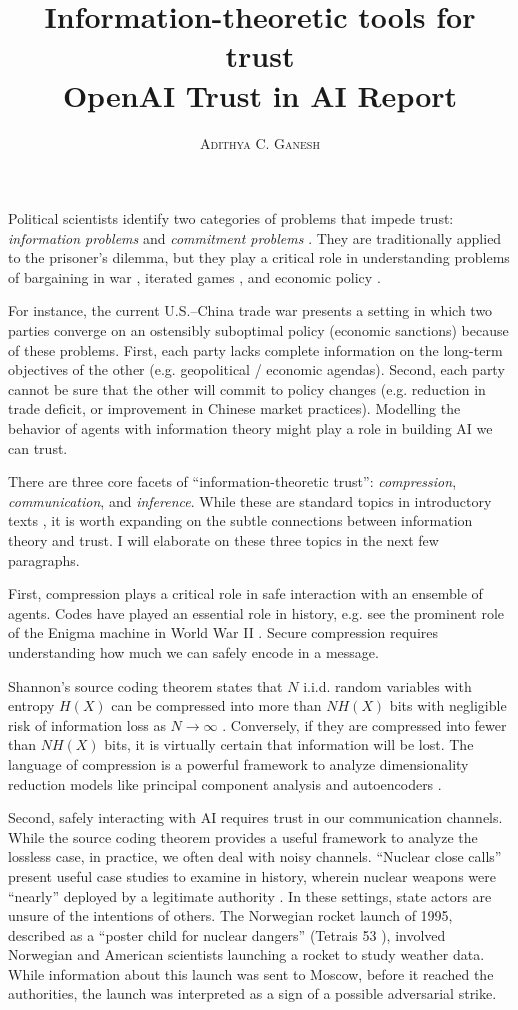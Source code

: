 \documentclass[11pt]{article}
\title{Information-theoretic tools for trust \\ \vspace{0.3cm} OpenAI Trust in AI Report}
\author{\textsc{Adithya C. Ganesh}}
\begin{document}
Political scientists identify two categories of problems that impede trust: {\it information problems} and {\it commitment problems} \cite{frieden2010world}.  They are traditionally applied to the prisoner's dilemma, but they play a critical role in understanding problems of bargaining in war \cite{lake2010two}, iterated games \cite{axelrod1981evolution}, and economic policy \cite{panagariya2003international}.

For instance, the current U.S.--China trade war presents a setting in which two parties converge on an ostensibly suboptimal policy (economic sanctions) because of these problems.  First, each party lacks complete information on the long-term objectives of the other (e.g. geopolitical / economic agendas).  Second, each party cannot be sure that the other will commit to policy changes (e.g. reduction in trade deficit, or improvement in Chinese market practices).  Modelling the behavior of agents with information theory might play a role in building AI we can trust. 

There are three core facets of ``information-theoretic trust'': {\it compression}, {\it communication}, and {\it inference}.  While these are standard topics in introductory texts \cite{cover2012elements}\cite{mackay2003information}, it is worth expanding on the subtle connections between information theory and trust.  I will elaborate on these three topics in the next few paragraphs.

First, compression plays a critical role in safe interaction with an ensemble of agents.  Codes have played an essential role in history, e.g. see the prominent role of the Enigma machine in World War II \cite{booss2003mathematics}.  Secure compression requires understanding how much we can safely encode in a message.

Shannon's source coding theorem states that $N$ i.i.d. random variables with entropy $H(X)$ can be compressed into more than $N H(X)$ bits with negligible risk of information loss as $N \to \infty$ \cite{shannon1948mathematical}\cite{mackay2003information}.  Conversely, if they are compressed into fewer than $N H(X)$ bits, it is virtually certain that information will be lost.  The language of compression is a powerful framework to analyze dimensionality reduction models like principal component analysis \cite{geiger2012relative} and autoencoders \cite{doersch2016tutorial}.

Second, safely interacting with AI requires trust in our communication channels.  While the source coding theorem provides a useful framework to analyze the lossless case, in practice, we often deal with noisy channels.  ``Nuclear close calls'' present useful case studies to examine in history, wherein nuclear weapons were ``nearly'' deployed by a legitimate authority \cite{tertrais2017brink}.  In these settings, state actors are unsure of the intentions of others.  The Norwegian rocket launch of 1995, described as a ``poster child for nuclear dangers'' (Tetrais 53 \cite{tetrais2017brink}), involved Norwegian and American scientists launching a rocket to study weather data.  While information about this launch was sent to Moscow, before it reached the authorities, the launch was interpreted as a sign of a possible adversarial strike.  
\end{document}
